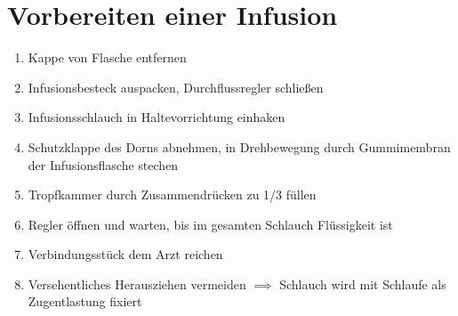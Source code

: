 \chapter{Vorbereiten einer Infusion}
\begin{enumerate}
    \item Kappe von Flasche entfernen
    \item Infusionsbesteck auspacken, Durchflussregler schließen
    \item Infusionsschlauch in Haltevorrichtung einhaken
    \item Schutzklappe des Dorns abnehmen, in Drehbewegung durch Gummimembran der Infusionsflasche stechen
    \item Tropfkammer durch Zusammendrücken zu 1/3 füllen
    \item Regler öffnen und warten, bis im gesamten Schlauch Flüssigkeit ist
    \item Verbindungsstück dem Arzt reichen
    \item Versehentliches Herausziehen vermeiden $\implies$ Schlauch wird mit Schlaufe als Zugentlastung fixiert
\end{enumerate}